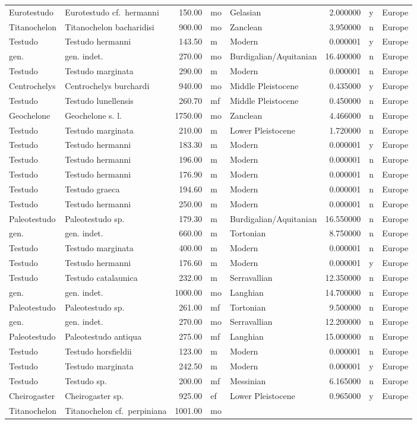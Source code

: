 \documentclass[]{article}
\begin{document}
\begin{longtable}[]{@{}llrllrll@{}}
Eurotestudo & Eurotestudo cf.~hermanni & 150.00 & mo & Gelasian &
2.000000 & y & Europe\tabularnewline
Titanochelon & Titanochelon bacharidisi & 900.00 & mo & Zanclean &
3.950000 & n & Europe\tabularnewline
Testudo & Testudo hermanni & 143.50 & m & Modern & 0.000001 & y &
Europe\tabularnewline
gen. & gen. indet. & 270.00 & mo & Burdigalian/Aquitanian & 16.400000 &
n & Europe\tabularnewline
Testudo & Testudo marginata & 290.00 & m & Modern & 0.000001 & n &
Europe\tabularnewline
Centrochelys & Centrochelys burchardi & 940.00 & mo & Middle Pleistocene
& 0.435000 & y & Europe\tabularnewline
Testudo & Testudo lunellensis & 260.70 & mf & Middle Pleistocene &
0.450000 & n & Europe\tabularnewline
Geochelone & Geochelone s. l. & 1750.00 & mo & Zanclean & 4.466000 & n &
Europe\tabularnewline
Testudo & Testudo marginata & 210.00 & m & Lower Pleistocene & 1.720000
& n & Europe\tabularnewline
Testudo & Testudo hermanni & 183.30 & m & Modern & 0.000001 & y &
Europe\tabularnewline
Testudo & Testudo hermanni & 196.00 & m & Modern & 0.000001 & n &
Europe\tabularnewline
Testudo & Testudo hermanni & 176.90 & m & Modern & 0.000001 & n &
Europe\tabularnewline
Testudo & Testudo graeca & 194.60 & m & Modern & 0.000001 & n &
Europe\tabularnewline
Testudo & Testudo hermanni & 250.00 & m & Modern & 0.000001 & n &
Europe\tabularnewline
Paleotestudo & Paleotestudo sp. & 179.30 & m & Burdigalian/Aquitanian &
16.550000 & n & Europe\tabularnewline
gen. & gen. indet. & 660.00 & m & Tortonian & 8.750000 & n &
Europe\tabularnewline
Testudo & Testudo marginata & 400.00 & m & Modern & 0.000001 & n &
Europe\tabularnewline
Testudo & Testudo hermanni & 176.60 & m & Modern & 0.000001 & y &
Europe\tabularnewline
Testudo & Testudo catalaunica & 232.00 & m & Serravallian & 12.350000 &
n & Europe\tabularnewline
gen. & gen. indet. & 1000.00 & mo & Langhian & 14.700000 & n &
Europe\tabularnewline
Paleotestudo & Paleotestudo sp. & 261.00 & mf & Tortonian & 9.500000 & n
& Europe\tabularnewline
gen. & gen. indet. & 270.00 & mo & Serravallian & 12.200000 & n &
Europe\tabularnewline
Paleotestudo & Paleotestudo antiqua & 275.00 & mf & Langhian & 15.000000
& n & Europe\tabularnewline
Testudo & Testudo horsfieldii & 123.00 & m & Modern & 0.000001 & n &
Europe\tabularnewline
Testudo & Testudo marginata & 242.50 & m & Modern & 0.000001 & y &
Europe\tabularnewline
Testudo & Testudo sp. & 200.00 & mf & Messinian & 6.165000 & n &
Europe\tabularnewline
Cheirogaster & Cheirogaster sp. & 925.00 & ef & Lower Pleistocene &
0.965000 & y & Europe\tabularnewline
Titanochelon & Titanochelon cf.~perpiniana & 1001.00 & mo &

\end{longtable}
\end{document}
